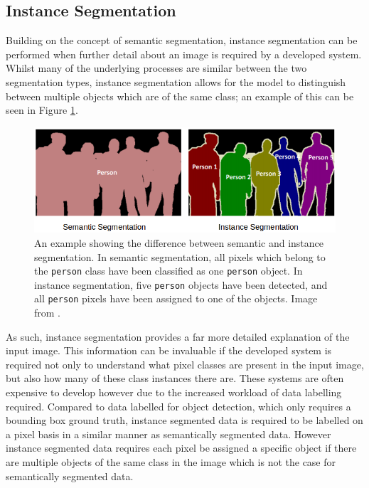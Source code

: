\subsection{Instance Segmentation}\label{ch:Background,sec:instanceSegmentation}

Building on the concept of semantic segmentation, instance segmentation can be performed when further detail about an image is required by a developed system. Whilst many of the underlying processes are similar between the two segmentation types, instance segmentation allows for the model to distinguish between multiple objects which are of the same class; an example of this can be seen in Figure \ref{fig:instance-vs-semantic}. 

\begin{figure}
	\begin{center}
		\includegraphics[scale=0.5]{Chapter2/figs/semantic_vs_instance_segmentation.png}
	\end{center}
	\caption{An example showing the difference between semantic and instance segmentation. In semantic segmentation, all pixels which belong to the \texttt{person} class have been classified as one \texttt{person} object. In instance segmentation, five \texttt{person} objects have been detected, and all \texttt{person} pixels have been assigned to one of the objects. Image from \cite{sharma_image_2019}.}
	\label{fig:instance-vs-semantic}
\end{figure}

As such, instance segmentation provides a far more detailed explanation of the input image. This information can be invaluable if the developed system is required not only to understand what pixel classes are present in the input image, but also how many of these class instances there are. These systems are often expensive to develop however due to the increased workload of data labelling required. Compared to data labelled for object detection, which only requires a bounding box ground truth, instance segmented data is required to be labelled on a pixel basis in a similar manner as semantically segmented data. However instance segmented data requires each pixel be assigned a specific object if there are multiple objects of the same class in the image which is not the case for semantically segmented data.

